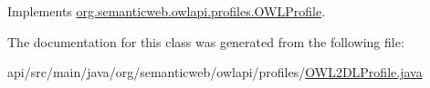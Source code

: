 Implements \hyperlink{interfaceorg_1_1semanticweb_1_1owlapi_1_1profiles_1_1_o_w_l_profile_a5dd9baeaba4c9170b2df1d037bc45ab9}{org.\-semanticweb.\-owlapi.\-profiles.\-O\-W\-L\-Profile}.



The documentation for this class was generated from the following file\-:\begin{DoxyCompactItemize}
\item 
api/src/main/java/org/semanticweb/owlapi/profiles/\hyperlink{_o_w_l2_d_l_profile_8java}{O\-W\-L2\-D\-L\-Profile.\-java}\end{DoxyCompactItemize}
